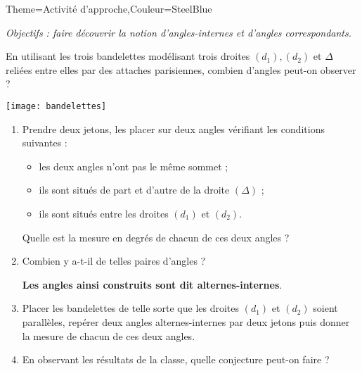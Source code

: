 \begin{Maquette}[Cours]{Theme={Activité d'approche},Couleur={SteelBlue}}

      {\it Objectifs : faire découvrir la notion d'angles-internes et d'angles correspondants.}

      \begin{AActivite}

         \begin{minipage}{10cm}
               En utilisant les trois bandelettes modélisant trois droites $(d_1), (d_2)$ et $\Delta$ reliées entre elles par des attaches parisiennes, combien d'angles peut-on observer ? \pointilles
         \end{minipage}
         \hfill
         \begin{minipage}{6cm}
            \texttt{[image: bandelettes]}
         \end{minipage}

            \begin{enumerate}
               \item Prendre deux jetons, les placer sur deux angles vérifiant les conditions suivantes :
                  \begin{itemize}
                     \item les deux angles n'ont pas le même sommet ;
                     \item ils sont situés de part et d'autre de la droite $(\Delta)$ ;
                     \item ils sont situés \og entre \fg{} les droites $(d_1)$ et $(d_2)$.
                  \end{itemize}
                  Quelle est la mesure en degrés de chacun de ces deux angles ? \pointilles
               \item Combien y a-t-il de telles paires d'angles ? \pointilles \par
                  {\bf Les angles ainsi construits sont dit alternes-internes}.
               \item Placer les bandelettes de telle sorte que les droites $(d_1)$ et $(d_2)$ soient parallèles, repérer deux angles alternes-internes par deux jetons puis donner la mesure de chacun de ces deux angles. \pointilles
               \item En observant les résultats de la classe, quelle conjecture peut-on faire ? \par
                  \pointilles
            \end{enumerate}


\end{AActivite}
\end{Maquette}
